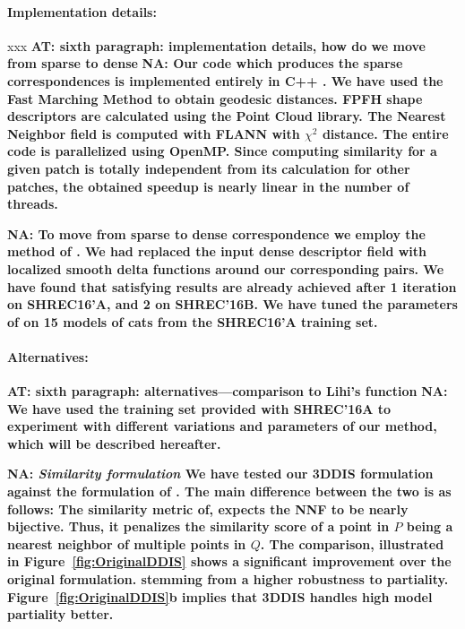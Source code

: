 \documentclass[10pt,twocolumn,letterpaper]{article}
\newcommand{\colornote}[3]{{\color{#1}\bf{#2: #3}\normalfont}}
\newcommand{\colornote}[3]{}
\newcommand {\ayellet}[1]{\colornote{blue}{AT}{#1}}
\newcommand {\nadav}[1]{\colornote{red}{NA}{#1}}
\begin{document}
\paragraph{Implementation details:} xxx
\ayellet{sixth paragraph: implementation details, how do we move from sparse to dense}
\nadav{Our code which produces the sparse correspondences is implemented entirely in C++ . 
We have used the Fast Marching Method\cite{kimmel1996fast} to obtain geodesic distances.
FPFH shape descriptors are calculated using the Point Cloud library\cite{Rusu_ICRA2011_PCL}. 
The Nearest Neighbor field is computed with FLANN\cite{muja2009fast} with $\chi^2$ distance.
The entire code is parallelized using OpenMP. Since computing similarity for a given patch is totally independent from its calculation for other patches, the obtained speedup is nearly linear in the number of threads. 
}

\nadav{
To move from sparse to dense correspondence we employ the method of \cite{litany2017fully}. 
We had replaced the input dense descriptor field with localized smooth delta functions around our corresponding pairs.
We have found that satisfying results are already achieved after 1 iteration on SHREC16'A, and 2 on SHREC'16B. We have tuned the parameters of \cite{litany2017fully} on 15 models of cats from the SHREC16'A training set.}


\paragraph{Alternatives:} 
\ayellet{sixth paragraph: alternatives---comparison to Lihi's function}
\nadav{ We have used the training set provided with SHREC'16A to experiment with different variations and parameters of our method, which will be described hereafter.}

\nadav{
\textit{Similarity formulation}	We have tested our 3DDIS formulation against the formulation of \cite{talmi2017template}. 
The main difference between the two is as follows:
The similarity metric of\cite{talmi2017template}, expects the NNF to be nearly bijective.
Thus, it penalizes the similarity score of a point in $P$ being a nearest neighbor of multiple points in $Q$. 
 The comparison, illustrated in Figure~\ref{fig:OriginalDDIS} shows a significant improvement over the original formulation. stemming from a higher robustness to partiality. Figure~\ref{fig:OriginalDDIS}b implies that 3DDIS handles high model partiality better.}
\end{document}
